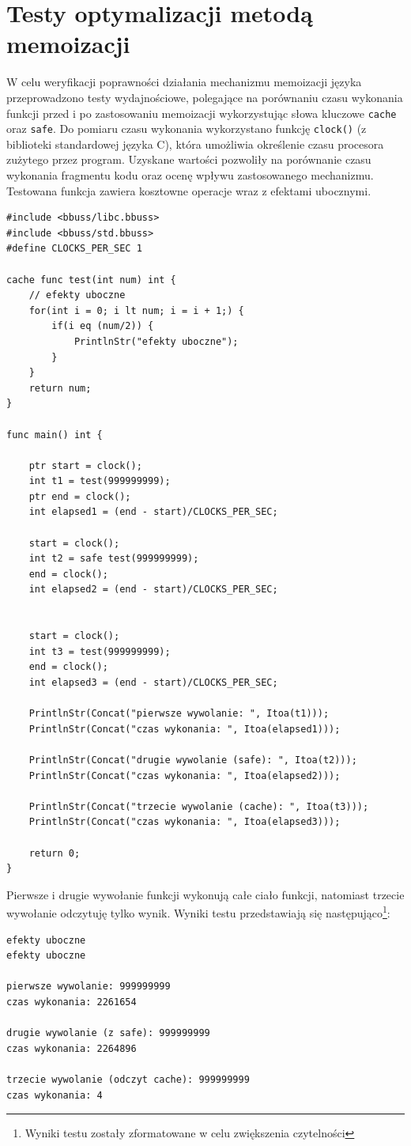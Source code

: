 \section{Testy optymalizacji metodą memoizacji}

W celu weryfikacji poprawności działania mechanizmu memoizacji języka przeprowadzono testy wydajnościowe, polegające na porównaniu czasu wykonania funkcji przed i po zastosowaniu memoizacji wykorzystując słowa kluczowe \verb|cache| oraz \verb|safe|. Do pomiaru czasu wykonania wykorzystano funkcję \verb|clock()| (z biblioteki standardowej języka C), która umożliwia określenie czasu procesora zużytego przez program. Uzyskane wartości pozwoliły na porównanie czasu wykonania fragmentu kodu oraz ocenę wpływu zastosowanego mechanizmu. Testowana funkcja zawiera kosztowne operacje wraz z efektami ubocznymi.


\begin{lstlisting}[caption={Test mechanizmu memoizacji}, morekeywords={func, cache, eq, str, ptr}]
#include <bbuss/libc.bbuss>
#include <bbuss/std.bbuss>
#define CLOCKS_PER_SEC 1

cache func test(int num) int {
    // efekty uboczne
    for(int i = 0; i lt num; i = i + 1;) {
        if(i eq (num/2)) {
            PrintlnStr("efekty uboczne");
        }
    }
    return num;
}

func main() int {

    ptr start = clock();
    int t1 = test(999999999);
    ptr end = clock();
    int elapsed1 = (end - start)/CLOCKS_PER_SEC;

    start = clock();
    int t2 = safe test(999999999);
    end = clock();
    int elapsed2 = (end - start)/CLOCKS_PER_SEC;


    start = clock();
    int t3 = test(999999999);
    end = clock();
    int elapsed3 = (end - start)/CLOCKS_PER_SEC;

    PrintlnStr(Concat("pierwsze wywolanie: ", Itoa(t1)));
    PrintlnStr(Concat("czas wykonania: ", Itoa(elapsed1)));

    PrintlnStr(Concat("drugie wywolanie (safe): ", Itoa(t2)));
    PrintlnStr(Concat("czas wykonania: ", Itoa(elapsed2)));

    PrintlnStr(Concat("trzecie wywolanie (cache): ", Itoa(t3)));
    PrintlnStr(Concat("czas wykonania: ", Itoa(elapsed3)));

    return 0;
}
\end{lstlisting}

Pierwsze i drugie wywołanie funkcji wykonują całe ciało funkcji, natomiast trzecie wywołanie odczytuję tylko wynik. Wyniki testu przedstawiają się następująco\footnote{Wyniki testu zostały zformatowane w celu zwiększenia czytelności}:

\begin{lstlisting}[caption={Wyniki testu memoizacji}]
efekty uboczne
efekty uboczne

pierwsze wywolanie: 999999999
czas wykonania: 2261654

drugie wywolanie (z safe): 999999999
czas wykonania: 2264896

trzecie wywolanie (odczyt cache): 999999999
czas wykonania: 4
\end{lstlisting}

